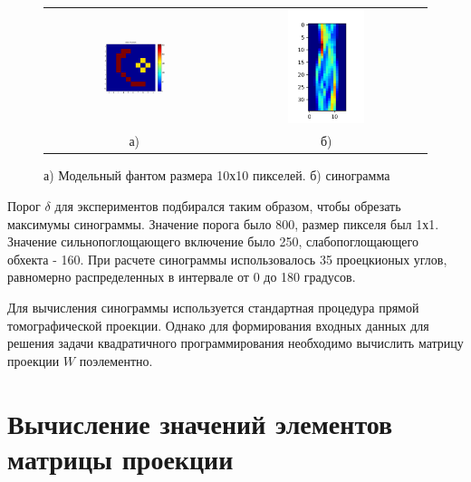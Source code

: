 \begin{figure}
    \centering
    \begin{tabular}{@{}c@{}c}
    \includegraphics[width=0.4\textwidth]{../Presentation/images/qp_phantom} 
    &
    \includegraphics[width=0.4\textwidth]{../Presentation/images/qp_sino} 
    \\
    а) & б)
    \end{tabular}
    \caption{а) Модельный фантом размера 10х10 пикселей. б) синограмма}
    \label{fig:qp_phantom_10by10}
\end{figure}

Порог $\delta$ для экспериментов подбирался таким образом, чтобы обрезать максимумы синограммы.
Значение порога было 800, размер пикселя был 1х1.
Значение сильнопоглощающего включение было 250, слабопоглощающего обхекта - 160.
При расчете синограммы использовалось 35 проецкионых углов, равномерно распределенных в интервале от 0 до 180 градусов.

Для вычисления синограммы используется стандартная процедура прямой томографической проекции.
Однако для формирования входных данных для решения задачи квадратичного программирования необходимо вычислить матрицу проекции $W$ поэлементно.

\section{Вычисление значений элементов матрицы проекции}

